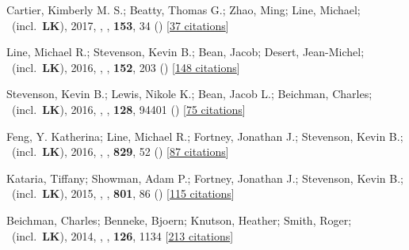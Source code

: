 \item[{\color{numcolor}\scriptsize11}] Cartier, Kimberly M. S.; Beatty, Thomas G.; Zhao, Ming; Line, Michael; \etal\ (incl.\ \textbf{LK}), 2017, , \aj, \textbf{153}, 34 () [\href{https://ui.adsabs.harvard.edu/abs/2017AJ....153...34C}{37 citations}]

\item[{\color{numcolor}\scriptsize10}] Line, Michael R.; Stevenson, Kevin B.; Bean, Jacob; Desert, Jean-Michel; \etal\ (incl.\ \textbf{LK}), 2016, , \aj, \textbf{152}, 203 () [\href{https://ui.adsabs.harvard.edu/abs/2016AJ....152..203L}{148 citations}]

\item[{\color{numcolor}\scriptsize9}] Stevenson, Kevin B.; Lewis, Nikole K.; Bean, Jacob L.; Beichman, Charles; \etal\ (incl.\ \textbf{LK}), 2016, , \pasp, \textbf{128}, 94401 () [\href{https://ui.adsabs.harvard.edu/abs/2016PASP..128i4401S}{75 citations}]

\item[{\color{numcolor}\scriptsize8}] Feng, Y. Katherina; Line, Michael R.; Fortney, Jonathan J.; Stevenson, Kevin B.; \etal\ (incl.\ \textbf{LK}), 2016, , \apj, \textbf{829}, 52 () [\href{https://ui.adsabs.harvard.edu/abs/2016ApJ...829...52F}{87 citations}]

\item[{\color{numcolor}\scriptsize7}] Kataria, Tiffany; Showman, Adam P.; Fortney, Jonathan J.; Stevenson, Kevin B.; \etal\ (incl.\ \textbf{LK}), 2015, , \apj, \textbf{801}, 86 () [\href{https://ui.adsabs.harvard.edu/abs/2015ApJ...801...86K}{115 citations}]

\item[{\color{numcolor}\scriptsize6}] Beichman, Charles; Benneke, Bjoern; Knutson, Heather; Smith, Roger; \etal\ (incl.\ \textbf{LK}), 2014, , \pasp, \textbf{126}, 1134 [\href{https://ui.adsabs.harvard.edu/abs/2014PASP..126.1134B}{213 citations}]

